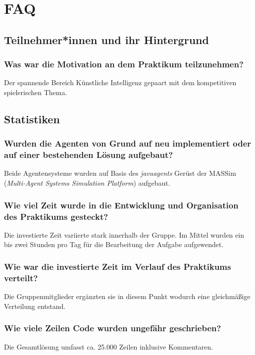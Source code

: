 \documentclass[runningheads]{llncs}
\begin{document}
	\section{FAQ}
	\subsection{Teilnehmer*innen und ihr Hintergrund}
	\subsubsection{Was war die Motivation an dem Praktikum teilzunehmen?\\}
	Der spannende Bereich Künstliche Intelligenz gepaart mit dem kompetitiven spielerischen Thema.
	
	\subsection{Statistiken}
	\subsubsection{Wurden die Agenten von Grund auf neu implementiert oder auf einer bestehenden Lösung aufgebaut?\\}
	Beide Agentensysteme wurden auf Basis des \textit{javaagents} Gerüst der MASSim (\textit{Multi-Agent Systems Simulation Platform}) aufgebaut.
	\subsubsection{Wie viel Zeit wurde in die Entwicklung und Organisation des Praktikums gesteckt?\\}
	Die investierte Zeit variierte stark innerhalb der Gruppe. Im Mittel wurden ein bis zwei Stunden pro Tag für die Bearbeitung der Aufgabe aufgewendet.
	\subsubsection{Wie war die investierte Zeit im Verlauf des Praktikums verteilt?\\}
	Die Gruppenmitglieder ergänzten sie in diesem Punkt wodurch eine gleichmäßige Verteilung entstand.
	\subsubsection{Wie viele Zeilen Code wurden ungefähr geschrieben?\\}
	Die Gesamtlösung umfasst ca. 25.000 Zeilen inklusive Kommentaren.
\end{document}
